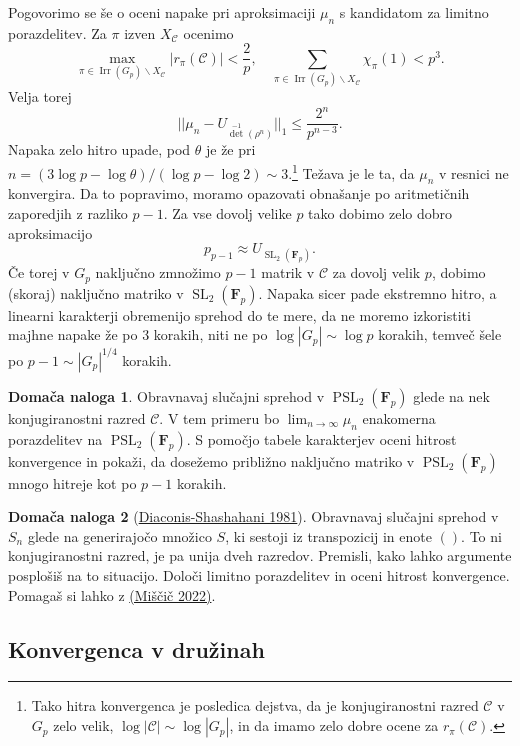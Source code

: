 \documentclass[11pt]{book}
\def\conclass{\mathcal{C}}
\def\FF{\mathbf{F}}
\DeclareMathOperator\Irr{Irr}
\DeclareMathOperator\SL{SL}
\DeclareMathOperator\PSL{PSL}
\theoremstyle{definition}
\theoremstyle{zgled}
\theoremstyle{odprtproblem}
\theoremstyle{domacanaloga}
\newtheorem*{domacanaloga}{Domača naloga}
\theoremstyle{izrek}
\begin{document}
Pogovorimo se še o oceni napake pri aproksimaciji $\mu_n$ s kandidatom za limitno porazdelitev. Za $\pi$ izven $X_{\conclass}$ ocenimo
\[
    \max_{\pi \in \Irr(G_p) \backslash X_{\conclass}} |r_{\pi}(\conclass)| < \frac{2}{p}, \quad
    \sum_{\pi \in \Irr(G_p) \backslash X_{\conclass}} \chi_{\pi}(1)
    < p^3.
\]
Velja torej
\[
    || \mu_n - U_{\det^{-1}(\rho^n)} ||_1
    \leq
    \frac{2^n}{p^{n-3}}.
\]
Napaka zelo hitro upade, pod $\theta$ je že pri $n = (3 \log p - \log \theta) / (\log p - \log 2) \sim 3$.\footnote{Tako hitra konvergenca je posledica dejstva, da je konjugiranostni razred $\conclass$ v $G_p$ zelo velik, $\log |\conclass| \sim \log |G_p|$, in da imamo zelo dobre ocene za $r_{\pi}(\conclass)$.} Težava je le ta, da $\mu_n$ v resnici ne konvergira. Da to popravimo, moramo opazovati obnašanje po aritmetičnih zaporedjih z razliko $p-1$. Za vse dovolj velike $p$ tako dobimo zelo dobro aproksimacijo
\[
    p_{p-1} \approx U_{\SL_2(\FF_p)}.
\]
Če torej v $G_p$ naključno zmnožimo $p-1$ matrik v $\conclass$ za dovolj velik $p$, dobimo (skoraj) naključno matriko v $\SL_2(\FF_p)$. Napaka sicer pade ekstremno hitro, a linearni karakterji obremenijo sprehod do te mere, da ne moremo izkoristiti majhne napake že po $3$ korakih, niti ne po $\log |G_p| \sim \log p$ korakih, temveč šele po $p-1 \sim |G_p|^{1/4}$ korakih. 

\begin{domacanaloga}
Obravnavaj slučajni sprehod v $\PSL_2(\FF_p)$ glede na nek konjugiranostni razred $\conclass$. V tem primeru bo $\lim_{n \to \infty} \mu_n$ enakomerna porazdelitev na $\PSL_2(\FF_p)$. S pomočjo tabele karakterjev oceni hitrost konvergence in pokaži, da dosežemo približno naključno matriko v $\PSL_2(\FF_p)$ mnogo hitreje kot po $p-1$ korakih.
\end{domacanaloga}

\begin{domacanaloga}[\href{https://link.springer.com/article/10.1007/BF00535487}{Diaconis-Shashahani 1981}]
Obravnavaj slučajni sprehod v $S_n$ glede na generirajočo množico $S$, ki sestoji iz transpozicij in enote $()$. To ni konjugiranostni razred, je pa unija dveh razredov. Premisli, kako lahko argumente posplošiš na to situacijo. Določi limitno porazdelitev in oceni hitrost konvergence. Pomagaš si lahko z \href{https://repozitorij.uni-lj.si/IzpisGradiva.php?id=139856&lang=eng}{(Miščič 2022)}.
\end{domacanaloga}

\subsection{Konvergenca v družinah}
\end{document}
